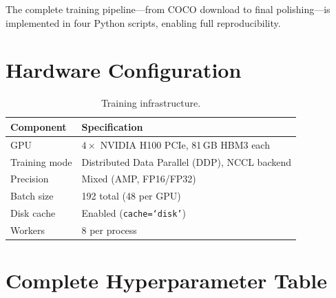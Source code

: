 \documentclass[11pt, a4paper]{article}
\begin{document}
\noindent The complete training pipeline---from COCO download to
final polishing---is implemented in four Python scripts, enabling
full reproducibility.

\appendix
\section{Hardware Configuration}
\label{app:hardware}

\begin{table}[h]
  \centering
  \caption{Training infrastructure.}
  \label{tab:hardware}
  \begin{tabular}{@{}ll@{}}
    \toprule
    \textbf{Component} & \textbf{Specification}                         \\
    \midrule
    GPU                & $4{\times}$ NVIDIA H100 PCIe, 81\,GB HBM3 each \\
    Training mode      & Distributed Data Parallel (DDP), NCCL backend  \\
    Precision          & Mixed (AMP, FP16/FP32)                         \\
    Batch size         & 192 total (48 per GPU)                         \\
    Disk cache         & Enabled (\texttt{cache=`disk'})                \\
    Workers            & 8 per process                                  \\
    \bottomrule
  \end{tabular}
\end{table}

\section{Complete Hyperparameter Table}
\label{app:hyperparams}
\end{document}
